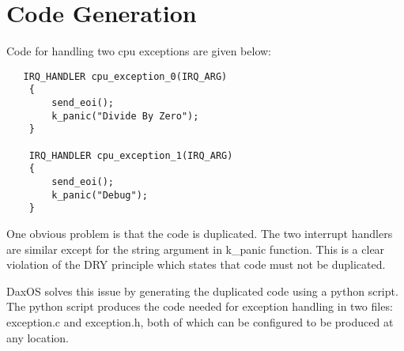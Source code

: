 \section{Code Generation}\label{section:Code Generation}
Code for handling two cpu exceptions are given below:
\begin{lstlisting}
   IRQ_HANDLER cpu_exception_0(IRQ_ARG)
    {
        send_eoi();
        k_panic("Divide By Zero");
    }

    IRQ_HANDLER cpu_exception_1(IRQ_ARG)
    {
        send_eoi();
        k_panic("Debug");
    }
\end{lstlisting}
One obvious problem is that the code is duplicated. The two interrupt handlers are similar except for the string argument in 
k\_panic function.
This is a clear violation of the DRY principle which states that code must not be duplicated. 

\vspace{0.4cm}
DaxOS solves this issue by generating the duplicated code using a python script.
The python script produces the code needed for exception handling in two files: \\exception.c and exception.h, both 
of which can be configured to be produced at any location.